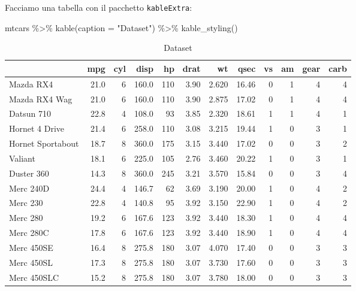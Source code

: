 \documentclass[
]{article}
\newenvironment{Shaded}{\begin{snugshade}}{\end{snugshade}}
\newcommand{\AttributeTok}[1]{\textcolor[rgb]{0.77,0.63,0.00}{#1}}
\newcommand{\FunctionTok}[1]{\textcolor[rgb]{0.00,0.00,0.00}{#1}}
\newcommand{\NormalTok}[1]{#1}
\newcommand{\SpecialCharTok}[1]{\textcolor[rgb]{0.00,0.00,0.00}{#1}}
\newcommand{\StringTok}[1]{\textcolor[rgb]{0.31,0.60,0.02}{#1}}
\begin{document}
Facciamo una tabella con il pacchetto \texttt{kableExtra}:

\begin{Shaded}
\begin{Highlighting}[]
\NormalTok{mtcars }\SpecialCharTok{\%\textgreater{}\%} 
  \FunctionTok{kable}\NormalTok{(}\AttributeTok{caption =} \StringTok{"Dataset"}\NormalTok{) }\SpecialCharTok{\%\textgreater{}\%} 
  \FunctionTok{kable\_styling}\NormalTok{()}
\end{Highlighting}
\end{Shaded}

\begin{table}

\caption{\label{tab:tab-data}Dataset}
\centering
\begin{tabular}[t]{l|r|r|r|r|r|r|r|r|r|r|r}
\hline
  & mpg & cyl & disp & hp & drat & wt & qsec & vs & am & gear & carb\\
\hline
Mazda RX4 & 21.0 & 6 & 160.0 & 110 & 3.90 & 2.620 & 16.46 & 0 & 1 & 4 & 4\\
\hline
Mazda RX4 Wag & 21.0 & 6 & 160.0 & 110 & 3.90 & 2.875 & 17.02 & 0 & 1 & 4 & 4\\
\hline
Datsun 710 & 22.8 & 4 & 108.0 & 93 & 3.85 & 2.320 & 18.61 & 1 & 1 & 4 & 1\\
\hline
Hornet 4 Drive & 21.4 & 6 & 258.0 & 110 & 3.08 & 3.215 & 19.44 & 1 & 0 & 3 & 1\\
\hline
Hornet Sportabout & 18.7 & 8 & 360.0 & 175 & 3.15 & 3.440 & 17.02 & 0 & 0 & 3 & 2\\
\hline
Valiant & 18.1 & 6 & 225.0 & 105 & 2.76 & 3.460 & 20.22 & 1 & 0 & 3 & 1\\
\hline
Duster 360 & 14.3 & 8 & 360.0 & 245 & 3.21 & 3.570 & 15.84 & 0 & 0 & 3 & 4\\
\hline
Merc 240D & 24.4 & 4 & 146.7 & 62 & 3.69 & 3.190 & 20.00 & 1 & 0 & 4 & 2\\
\hline
Merc 230 & 22.8 & 4 & 140.8 & 95 & 3.92 & 3.150 & 22.90 & 1 & 0 & 4 & 2\\
\hline
Merc 280 & 19.2 & 6 & 167.6 & 123 & 3.92 & 3.440 & 18.30 & 1 & 0 & 4 & 4\\
\hline
Merc 280C & 17.8 & 6 & 167.6 & 123 & 3.92 & 3.440 & 18.90 & 1 & 0 & 4 & 4\\
\hline
Merc 450SE & 16.4 & 8 & 275.8 & 180 & 3.07 & 4.070 & 17.40 & 0 & 0 & 3 & 3\\
\hline
Merc 450SL & 17.3 & 8 & 275.8 & 180 & 3.07 & 3.730 & 17.60 & 0 & 0 & 3 & 3\\
\hline
Merc 450SLC & 15.2 & 8 & 275.8 & 180 & 3.07 & 3.780 & 18.00 & 0 & 0 & 3 & 3\\

\end{tabular}
\end{table}
\end{document}

